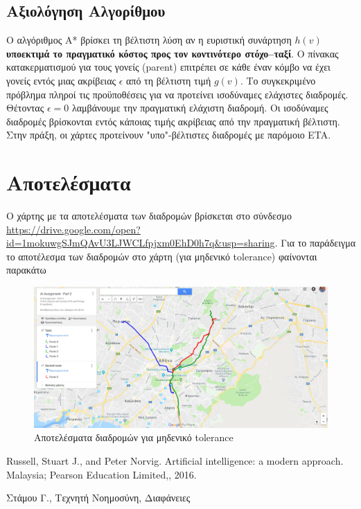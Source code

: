 \documentclass[a4paper,12pt]{article}
\begin{document}
\subsection{Αξιολόγηση Αλγορίθμου} 

Ο αλγόριθμος Α* βρίσκει τη βέλτιστη λύση αν η ευριστική συνάρτηση $h(v)$ \textbf{υποεκτιμά το πραγματικό κόστος προς τον κοντινότερο στόχο--ταξί}. Ο πίνακας κατακερματισμού για τους γονείς (parent) επιτρέπει σε κάθε έναν κόμβο να έχει γονείς εντός μιας ακρίβειας $\epsilon$ από τη βέλτιστη τιμή $g(v)$. Το συγκεκριμένο πρόβλημα πληροί τις προϋποθέσεις για να προτείνει ισοδύναμες ελάχιστες διαδρομές. Θέτοντας $\epsilon = 0$ λαμβάνουμε την πραγματική ελάχιστη διαδρομή. Οι ισοδύναμες διαδρομές βρίσκονται εντός κάποιας τιμής ακρίβειας από την πραγματική βέλτιστη. Στην πράξη, οι χάρτες προτείνουν "υπο"-βέλτιστες διαδρομές με παρόμοιο ETA. 

\section{Αποτελέσματα}

Ο χάρτης με τα αποτελέσματα των διαδρομών βρίσκεται στο σύνδεσμο \url{https://drive.google.com/open?id=1mokuwgSJmQAvU3LJWCLfpjxm0EhD0h7q&usp=sharing}. Για το παράδειγμα το αποτέλεσμα των διαδρομών στο χάρτη (για μηδενικό tolerance) φαίνονται παρακάτω

\begin{figure}[H]
\centering
\includegraphics[scale=0.25]{example.png}
\caption{Αποτελέσματα διαδρομών για μηδενικό tolerance}
\label{}
\end{figure}




\begin{thebibliography}{9}

 Russell, Stuart J., and Peter Norvig. Artificial intelligence: a modern approach. Malaysia; Pearson Education Limited,, 2016.

 Στάμου Γ., Τεχνητή Νοημοσύνη, Διαφάνειες

\end{thebibliography}
\end{document}
